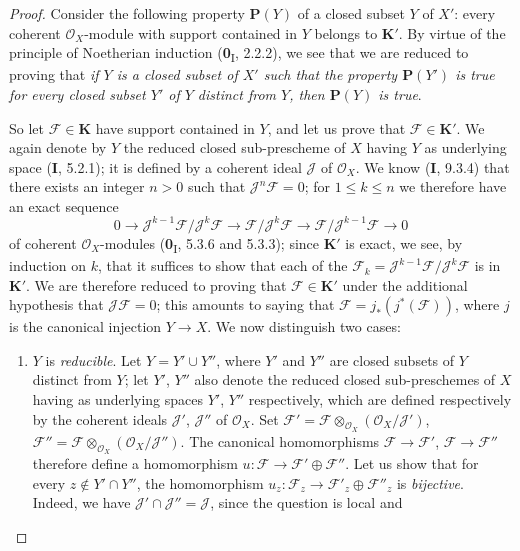 \begin{proof}
Consider the following property $\boldsymbol{P}(Y)$ of a closed subset $Y$ of $X'$:
every coherent $\mathcal O_X$-module with support contained in $Y$ belongs to
$\boldsymbol{K}'$. By virtue of the principle of Noetherian induction (\textbf{0}\textsubscript{I},
2.2.2), we see that we are reduced to proving that \emph{if $Y$ is a closed
subset of $X'$ such that the property $\boldsymbol{P}(Y')$ is true for every closed
subset $Y'$ of $Y$ distinct from $Y$, then $\boldsymbol{P}(Y)$ is true}.

So let $\mathcal F\in\boldsymbol{K}$ have support contained in $Y$, and let us prove that
$\mathcal F\in\boldsymbol{K}'$. We again denote by $Y$ the reduced closed sub-prescheme of
$X$ having $Y$ as underlying space (\textbf{I}, 5.2.1); it is defined by a coherent
ideal $\mathcal J$ of $\mathcal O_X$. We know (\textbf{I}, 9.3.4) that there exists an
integer $n>0$ such that $\mathcal J^n\mathcal F=0$; for $1\leq k\leq n$ we
therefore have an exact sequence
\[
0\longrightarrow
\mathcal J^{k-1}\mathcal F/\mathcal J^k\mathcal F
\longrightarrow \mathcal F/\mathcal J^k\mathcal F
\longrightarrow \mathcal F/\mathcal J^{k-1}\mathcal F
\longrightarrow0
\]
of coherent $\mathcal O_X$-modules (\textbf{0}\textsubscript{I}, 5.3.6 and 5.3.3);
since $\boldsymbol{K}'$ is exact, we see, by induction on $k$, that it suffices to show
that each of the
$\mathcal F_k=\mathcal J^{k-1}\mathcal F/\mathcal J^k\mathcal F$ is in
$\boldsymbol{K}'$. We are therefore reduced to proving that $\mathcal F\in \boldsymbol{K}'$ under the
additional hypothesis that $\mathcal J\mathcal F=0$; this amounts to saying that
$\mathcal F=j_*(j^*(\mathcal F))$, where $j$ is the canonical injection
$Y\to X$. We now distinguish two cases:
\begin{enumerate}
\item[\textit{a)}] $Y$ is \emph{reducible}. Let $Y=Y'\cup Y''$, where $Y'$ and $Y''$
are closed subsets of $Y$ distinct from $Y$; let $Y'$,
$Y''$ also denote the reduced closed sub-preschemes of $X$ having as underlying
spaces $Y'$, $Y''$ respectively, which are defined respectively by
the coherent ideals $\mathcal J'$, $\mathcal J''$ of $\mathcal O_X$. Set $\mathcal F'=\mathcal F\otimes_{\mathcal O_X}
(\mathcal O_X/\mathcal J')$,
$\mathcal F''=\mathcal F\otimes_{\mathcal O_X}
(\mathcal O_X/\mathcal J'')$.
The canonical homomorphisms $\mathcal F\to\mathcal F'$,
$\mathcal F\to\mathcal F''$ therefore define a homomorphism
$u:\mathcal F\to\mathcal F'\oplus\mathcal F''$. Let us show that for every
$z\notin Y'\cap Y''$, the homomorphism
$u_z:\mathcal F_z\to\mathcal F'_z\oplus\mathcal F''_z$ is \emph{bijective}.
Indeed, we have $\mathcal J'\cap\mathcal J''=\mathcal J$, since the question is
local and


\end{enumerate}
\end{proof}

